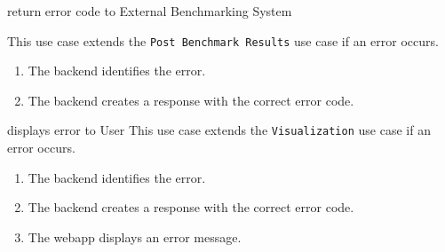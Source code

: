\bigskip

{return error code to External Benchmarking System}
{}
{This use case extends the \texttt{Post Benchmark Results} use case if an error occurs.
\begin{enumerate}
    \item The backend identifies the error.
    \item The backend creates a response with the correct error code.
\end{enumerate}}
{}

\bigskip

{displays error to User}
{This use case extends the \texttt{Visualization} use case if an error occurs.}
{\begin{enumerate}
    \item The backend identifies the error.
    \item The backend creates a response with the correct error code.
    \item The webapp displays an error message.
\end{enumerate}}
{}

